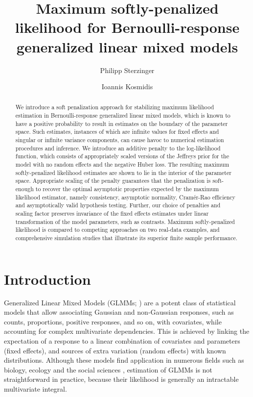 \documentclass[11pt, a4paper]{article}
\title{Maximum softly-penalized likelihood for Bernoulli-response generalized linear mixed models}
\author[1]{Philipp Sterzinger}
\author[1,2]{Ioannis Kosmidis}
\affil[1]{Department of Statistics, University of Warwick, Coventry, CV4 7AL, UK}
\affil[2]{The Alan Turing Institute, London, NW1 2DB, UK}
\theoremstyle{example} \newtheorem{example}{Example}[section]
\theoremstyle{theorem} \newtheorem{theorem}{Theorem}[section]
\begin{document}
\maketitle

\begin{abstract}
  We introduce a soft penalization approach for stabilizing maximum
  likelihood estimation in Bernoulli-response generalized linear mixed
  models, which is known to have a positive probability to result in
  estimates on the boundary of the parameter space. Such estimates, instances of which
  are infinite values for fixed effects and singular or
  infinite variance components, can cause havoc to numerical
  estimation procedures and inference. We introduce an additive penalty to the log-likelihood function, 
  which consists of appropriately scaled versions of the Jeffreys
  prior for the model with no random effects and the negative Huber loss. The resulting maximum softly-penalized likelihood
  estimates are shown to lie in the interior of the parameter
  space. Appropriate scaling of the penalty guarantees that the penalization is soft-enough to recover
  the optimal asymptotic properties expected by the maximum likelihood
  estimator, namely consistency, asymptotic normality,
  Cram\'{e}r-Rao efficiency and asymptotically valid hypothesis testing. Further, our choice of penalties and scaling factor preserves invariance of the fixed effects estimates under linear transformation of the model
  parameters, such as contrasts. Maximum softly-penalized likelihood
  is compared to competing approaches on two real-data examples,
  and comprehensive simulation studies that illustrate its superior finite sample
  performance.
  \bigskip \\
\end{abstract}

\section{Introduction}
\label{sec:intro}

Generalized Linear Mixed Models (GLMMs; \citealt[Chapter
7]{mcculloch+etal:2008}) are a potent class of statistical models
that allow associating Gaussian and non-Gaussian responses, such as
counts, proportions, positive responses, and so on, with covariates,
while accounting for complex multivariate dependencies. This is achieved by linking
the expectation of a response to a linear combination of covariates
and parameters (fixed effects), and sources of extra variation (random
effects) with known distributions. Although these models find
application in numerous fields such as biology, ecology and the social
sciences \citep{bolker+etal:2009}, estimation of GLMMs is not
straightforward in practice, because their likelihood is generally an intractable
multivariate integral.
\end{document}
